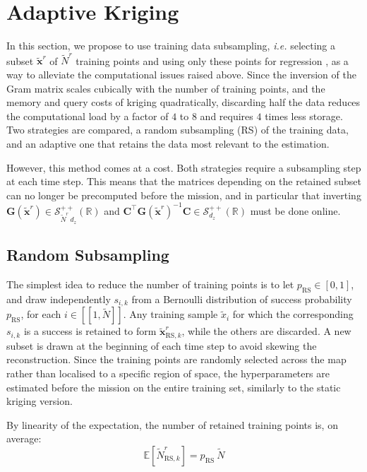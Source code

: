 \section{Adaptive Kriging}\label{sec:AK_PF}

In this section, we propose to use training data subsampling, \textit{i.e.} selecting a subset $\tilde{\mathbf{x}}^r$ of $\tilde{N}^r$ training points and using only these points for regression \cite{bib:Rasmussen-approximation,bib:sparse-GP}, as a way to alleviate the computational issues raised above. Since the inversion of the Gram matrix scales cubically with the number of training points, and the memory and query costs of kriging quadratically, discarding half the data reduces the computational load by a factor of $4$ to $8$ and requires $4$ times less storage. Two strategies are compared, a random subsampling (RS) of the training data, and an adaptive one that retains the data most relevant to the estimation.

However, this method comes at a cost. Both strategies require a subsampling step at each time step. This means that the matrices depending on the retained subset can no longer be precomputed before the mission, and in particular that inverting $\mathbf{G}(\tilde{\mathbf{x}}^r)\in\mathcal{S}_{\tilde{N}^r\:d_z}^{++}(\mathbb{R})$ and $\mathbf{C}^\top \mathbf{G}(\tilde{\mathbf{x}}^r)^{-1}\mathbf{C}\in\mathcal{S}_{d_z}^{++}(\mathbb{R})$ must be done online.

\subsection{Random Subsampling}

The simplest idea to reduce the number of training points is to let $p_{\mathrm{RS}}\in[0,1]$, and draw independently $s_{i,k}$ from a Bernoulli distribution of success probability $p_{\mathrm{RS}}$, for each $i\in[\![1,\tilde{N}]\!]$. Any training sample $\tilde{x}_i$ for which the corresponding $s_{i,k}$ is a success is retained to form $\tilde{\mathbf{x}}_{\mathrm{RS},k}^r$, while the others are discarded. A new subset is drawn at the beginning of each time step to avoid skewing the reconstruction. Since the training points are randomly selected across the map rather than localised to a specific region of space, the hyperparameters are estimated before the mission on the entire training set, similarly to the static kriging version.

By linearity of the expectation, the number of retained training points is, on average:
\begin{equation}
	\mathbb{E}\left[\tilde{N}_{\mathrm{RS},k}^r\right]=p_{\mathrm{RS}}\:\tilde{N}
\end{equation}

